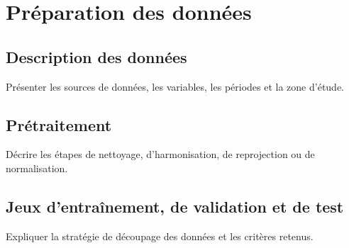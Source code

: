 \chapter{Préparation des données}\label{chap:preparation-donnees}
\chaptertoc

\section{Description des données}
Présenter les sources de données, les variables, les périodes et la zone d'étude.

\section{Prétraitement}
Décrire les étapes de nettoyage, d'harmonisation, de reprojection ou de normalisation.

\section{Jeux d'entraînement, de validation et de test}
Expliquer la stratégie de découpage des données et les critères retenus.
